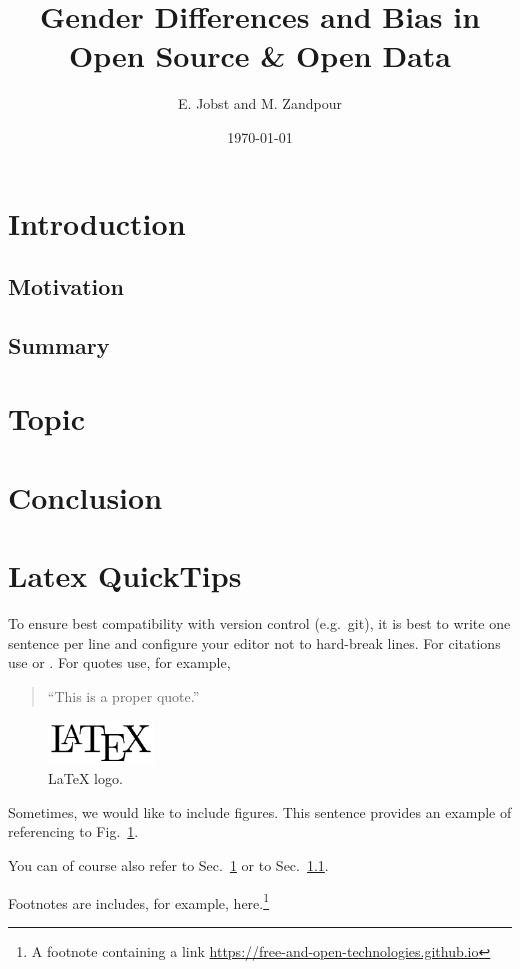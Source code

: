 \documentclass[a4paper, 11pt]{article}
\title{Gender Differences and Bias in Open Source \& Open Data}
\begin{document}
\date{\today}
\author{E. Jobst and M. Zandpour}
\maketitle

\section{Introduction} \label{sec:intro}

\subsection{Motivation} \label{sec:intro:motivation}

\subsection{Summary} \label{sec:intro:summary}

\section{Topic} \label{sec:topic}

\section{Conclusion} \label{sec:conclusion}




\doclicenseThis

\section{Latex QuickTips} \label{sec:tips}

To ensure best compatibility with version control (e.g.\ git), it is best to write one sentence per line and configure your editor not to hard-break lines.
For citations use \cite{terrell-gender-bias} or \cite[p.\ 6--8]{terrell-gender-bias}.
For quotes use, for example,
\begin{quote}
	``This is a proper quote.'' 
\end{quote}

\begin{figure}[t]
	\centering
	\includegraphics[width=0.25\textwidth]{figures/logo.png}
\caption{LaTeX logo.} \label{fig:logo}
\end{figure}

Sometimes, we would like to include figures.
This sentence provides an example of referencing to Fig.~\ref{fig:logo}.

You can of course also refer to Sec.~\ref{sec:intro} or to Sec.~\ref{sec:intro:motivation}.

Footnotes are includes, for example, here.\footnote{A footnote containing a link \url{https://free-and-open-technologies.github.io}}
\end{document}

